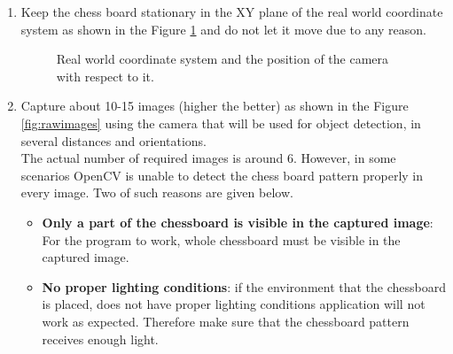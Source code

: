 \documentclass[a4paper,12pt]{report}%
\begin{document}
\begin{enumerate}
	\item Keep the chess board stationary in the XY plane of the real world coordinate system as shown in the Figure \ref{fig:clib3dworld} and do not let it move due to any reason.
	
	\begin{figure}[H]
		\centering
		\caption{Real world coordinate system and the position of the camera with respect to it. }
		\label{fig:clib3dworld}
	\end{figure}
	
	\item Capture about 10-15 images (higher the better) as shown in the Figure \ref{fig:rawimages} using the camera that will be used for object detection, in several distances and orientations.\\
	
	The actual number of required images is around 6. However, in some scenarios OpenCV is unable to detect the chess board pattern properly in every image. Two of such reasons are given below.
	
	\begin{itemize}
		\item\textbf{Only a part of the chessboard is visible in the captured image}: For the program to work, whole chessboard must be visible in the captured image.
		
		\item \textbf{No proper lighting conditions}: if the environment that the  chessboard is placed, does not have proper lighting conditions application will not work as expected. Therefore make sure that the chessboard pattern receives enough light.
		

\end{itemize}
\end{enumerate}
\end{document}
